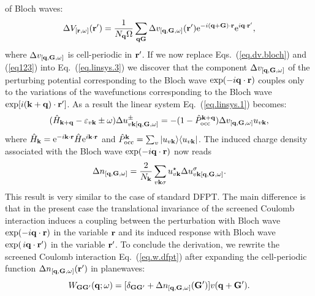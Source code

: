 \documentclass[twocolumn,prb,showpacs,superscriptaddress]{revtex4}
\def\s1{\hspace{0.5cm}}
\def\s2{\hspace{1cm}}
\def\w{\omega}
\def\H{\hat{H}}
\def\P{\hat{P}_{\rm occ}}
\def\E{\varepsilon}
\def\q{{\bf q}}
\def\s{\sigma}
\def\k{{\bf k}}
\def\G{{\bf G}}
\def\Gp{{\bf G^\prime}}
\def\r{{\bf r}}
\def\rp{{\bf r^\prime}}
\begin{document}
of Bloch waves: 
  \begin{equation}\label{eq.dv.bloch}
  \Delta V_{[\r,\w]} (\rp) = \frac{1}{N_\q\Omega}  \sum_{\q\G} \Delta v_{[\q,\G,\w]}(\rp) 
   {\rm e}^{-i(\q+\G)\cdot\r} {\rm e}^{i\q\cdot\rp}, 
  \end{equation}
where $\Delta v_{[\q,\G,\w]}$ is cell-periodic in $\rp$.
If we now replace Eqs.\ (\ref{eq.dv.bloch}) and (\ref{eq123}) into Eq.\ (\ref{eq.linsys.3})
we discover that the component $\Delta v_{[\q,\G,\w]}$ of the
perturbing potential corresponding to the Bloch wave ${\rm exp}(-i\q\cdot\r)$
couples only to the variations of the wavefunctions corresponding to
the Bloch wave ${\rm exp}[i(\k+\q)\cdot\rp]$.
As a result the linear system Eq.\ (\ref{eq.linsys.1}) becomes:
  \begin{equation}\label{eq.linsys.4}
  (\H_{\k+\q}-\E_{v\k}\pm\w) \Delta u^\pm_{v\k[\q,\G,\w]}  = -(1-\P^{\k+\q}) \Delta v_{[\q,\G,\w]} u_{v\k},
  \end{equation}
where $\H_\k= {\rm e}^{-i\k\cdot\r} \H {\rm e}^{i\k\cdot\r}$ and
$\P^\k=\sum_v | u_{v\k} \rangle \langle u_{v\k}|$.
The induced charge density associated with the Bloch wave ${\rm exp}(-i\q\cdot\r)$ 
now reads 
  \begin{equation} \label{eq.deltan.bloch}
  \Delta n_{[\q,\G,\w]} = \frac{2}{N_\k}\sum_{v\k\s} u_{v\k}^\star  \Delta u^\s_{v\k[\q,\G,\w]}.
  \end{equation}
This result is very similar to the case of standard DFPT.\cite{baroni.rmp} 
The main difference is that in the present case the translational invariance 
of the screened Coulomb interaction induces a coupling between the perturbation 
with Bloch wave ${\rm exp}(-i\q\cdot\r)$ in the variable $\r$ and its induced
response with Bloch wave ${\rm exp}(\,i\q\cdot\rp)$ in the variable $\rp$.
%
To conclude the derivation, we rewrite the screened Coulomb interaction 
Eq.\ (\ref{eq.w.dfpt}) after expanding the cell-periodic function 
$\Delta n_{[\q,\G,\w]}(\rp)$ in planewaves:
  \begin{equation}\label{eq.w.deltan.g}
  W_{\G\Gp}(\q;\w) = [\delta_{\G\Gp} + \Delta n_{[\q,\G,\w]}(\Gp) ]v(\q+\Gp).
  \end{equation}
\end{document}
